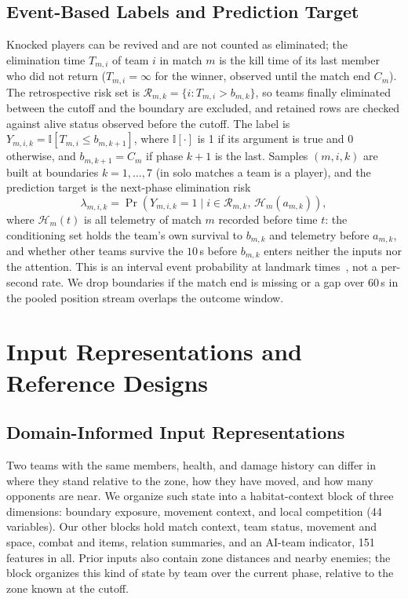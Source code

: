 \documentclass[sigconf,anonymous]{acmart}
\begin{document}
\subsection{Event-Based Labels and Prediction Target}
\label{sec:method:labels}
Knocked players can be revived and are not counted as eliminated; the elimination time $T_{m,i}$ of team $i$ in match $m$ is the kill time of its last member who did not return ($T_{m,i}=\infty$ for the winner, observed until the match end $C_m$). The retrospective risk set is $\mathcal{R}_{m,k}=\{i:T_{m,i}>b_{m,k}\}$, so teams finally eliminated between the cutoff and the boundary are excluded, and retained rows are checked against alive status observed before the cutoff. The label is $Y_{m,i,k}=\mathbb{I}[T_{m,i}\le b_{m,k+1}]$, where $\mathbb{I}[\cdot]$ is 1 if its argument is true and 0 otherwise, and $b_{m,k+1}=C_m$ if phase $k+1$ is the last. Samples $(m,i,k)$ are built at boundaries $k=1,\dots,7$ (in solo matches a team is a player), and the prediction target is the next-phase elimination risk
\begin{equation}
\lambda_{m,i,k}=\Pr\!\left(Y_{m,i,k}=1 \mid i\in\mathcal{R}_{m,k},\,\mathcal{H}_{m}(a_{m,k})\right),
\label{eq:hazard}
\end{equation}
where $\mathcal{H}_{m}(t)$ is all telemetry of match $m$ recorded before time $t$: the conditioning set holds the team's own survival to $b_{m,k}$ and telemetry before $a_{m,k}$, and whether other teams survive the $10$\,s before $b_{m,k}$ enters neither the inputs nor the attention. This is an interval event probability at landmark times~\cite{vanHouwelingen07}, not a per-second rate. We drop boundaries if the match end is missing or a gap over 60\,s in the pooled position stream overlaps the outcome window.

\section{Input Representations and Reference Designs}
\label{sec:method:design}
\subsection{Domain-Informed Input Representations}
\label{sec:method:representation}
Two teams with the same members, health, and damage history can differ in where they stand relative to the zone, how they have moved, and how many opponents are near. We organize such state into a habitat-context block of three dimensions: boundary exposure, movement context, and local competition (44 variables). Our other blocks hold match context, team status, movement and space, combat and items, relation summaries, and an AI-team indicator, 151 features in all. Prior inputs also contain zone distances and nearby enemies; the block organizes this kind of state by team over the current phase, relative to the zone known at the cutoff.
\end{document}
